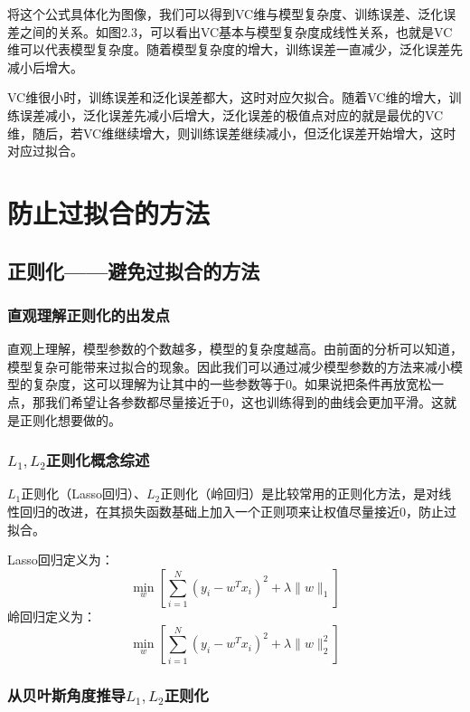 \documentclass[forprint]{report}
\begin{document}
将这个公式具体化为图像，我们可以得到VC维与模型复杂度、训练误差、泛化误差之间的关系。如图2.3，可以看出VC基本与模型复杂度成线性关系，也就是VC维可以代表模型复杂度。随着模型复杂度的增大，训练误差一直减少，泛化误差先减小后增大。

VC维很小时，训练误差和泛化误差都大，这时对应欠拟合。随着VC维的增大，训练误差减小，泛化误差先减小后增大，泛化误差的极值点对应的就是最优的VC维，随后，若VC维继续增大，则训练误差继续减小，但泛化误差开始增大，这时对应过拟合。
\chapter{防止过拟合的方法}
\section{正则化——避免过拟合的方法}
\subsection{直观理解正则化的出发点}
直观上理解，模型参数的个数越多，模型的复杂度越高。由前面的分析可以知道，模型复杂可能带来过拟合的现象。因此我们可以通过减少模型参数的方法来减小模型的复杂度，这可以理解为让其中的一些参数等于0。如果说把条件再放宽松一点，那我们希望让各参数都尽量接近于0，这也训练得到的曲线会更加平滑。这就是正则化想要做的。
\subsection{$L_1,L_2$正则化概念综述}
$L_1$正则化（Lasso回归）、$L_2$正则化（岭回归）是比较常用的正则化方法，是对线性回归的改进，在其损失函数基础上加入一个正则项来让权值尽量接近0，防止过拟合。

\noindent
Lasso回归定义为：
$$
\min_w \left[ \sum_{i=1}^N{\left( y_i-w^Tx_i \right) ^2+\lambda \lVert w \rVert _1} \right] 
$$
岭回归定义为：
$$
\min_w \left[ \sum_{i=1}^N{\left( y_i-w^Tx_i \right) ^2+\lambda \lVert w \rVert _{2}^{2}} \right] 
$$
\subsection{从贝叶斯角度推导$L_1,L_2$正则化}
\end{document}
